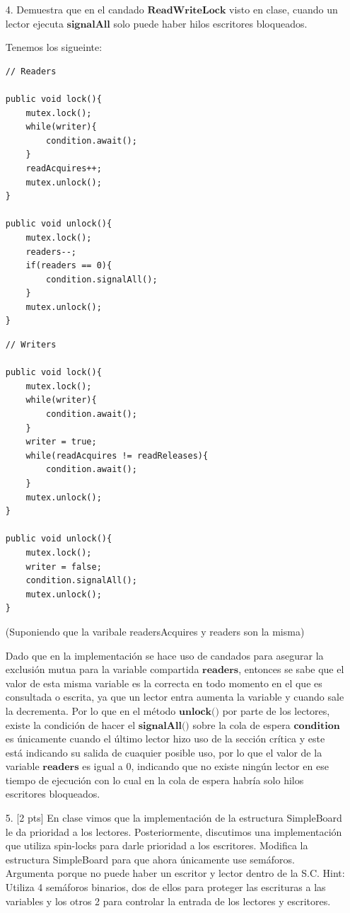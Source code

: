\documentclass[12pt, letterpaper]{article}
\begin{document}
\begin{itemize}
\item[4. ]Demuestra que en el candado $\textbf{ReadWriteLock}$ visto en clase, cuando un lector
ejecuta $\textbf{signalAll}$ solo puede haber hilos escritores bloqueados.

Tenemos los sigueinte:

\begin{minipage}{0.45\linewidth}
\begin{lstlisting}
// Readers

public void lock(){
	mutex.lock();
	while(writer){
		condition.await();
	}
	readAcquires++;
	mutex.unlock();
}

public void unlock(){
	mutex.lock();
	readers--;
	if(readers == 0){
		condition.signalAll();
	}
	mutex.unlock();
}
\end{lstlisting}
\end{minipage}
\hfill
\begin{minipage}{0.45\linewidth}
\begin{lstlisting}
// Writers

public void lock(){
	mutex.lock();
	while(writer){
		condition.await();
	}	
	writer = true;
	while(readAcquires != readReleases){
		condition.await();
	}
	mutex.unlock();
}

public void unlock(){
	mutex.lock();
	writer = false;
	condition.signalAll();
	mutex.unlock();
}

\end{lstlisting}
\end{minipage}
(Suponiendo que la varibale readersAcquires y readers son la misma)

Dado que en la implementación se hace uso de candados para asegurar la exclusión mutua para la variable compartida $\textbf{readers}$, entonces se sabe que el valor de esta misma variable es la correcta en todo momento en el que es consultada o escrita, ya que un lector entra aumenta la variable y cuando sale la decrementa. Por lo que en el método $\textbf{unlock()}$ por parte de los lectores, existe la condición de hacer el $\textbf{signalAll()}$ sobre la cola de espera $\textbf{condition}$ es únicamente cuando el último lector hizo uso de la sección crítica y este está indicando su salida de cuaquier posible uso, por lo que el valor de la variable $\textbf{readers}$ es igual a 0, indicando que no existe ningún lector en ese tiempo de ejecución con lo cual en la cola de espera habría solo hilos escritores bloqueados.

\item[5. ][2 pts] En clase vimos que la implementación de la estructura SimpleBoard le
da prioridad a los lectores. Posteriormente, discutimos una implementación que
utiliza spin-locks para darle prioridad a los escritores. Modifica la estructura
SimpleBoard para que ahora únicamente use semáforos. Argumenta porque no
puede haber un escritor y lector dentro de la S.C. Hint: Utiliza 4 semáforos
binarios, dos de ellos para proteger las escrituras a las variables y los otros 2
para controlar la entrada de los lectores y escritores.
\begin{lstlisting}


\end{lstlisting}
\end{itemize}
\end{document}
